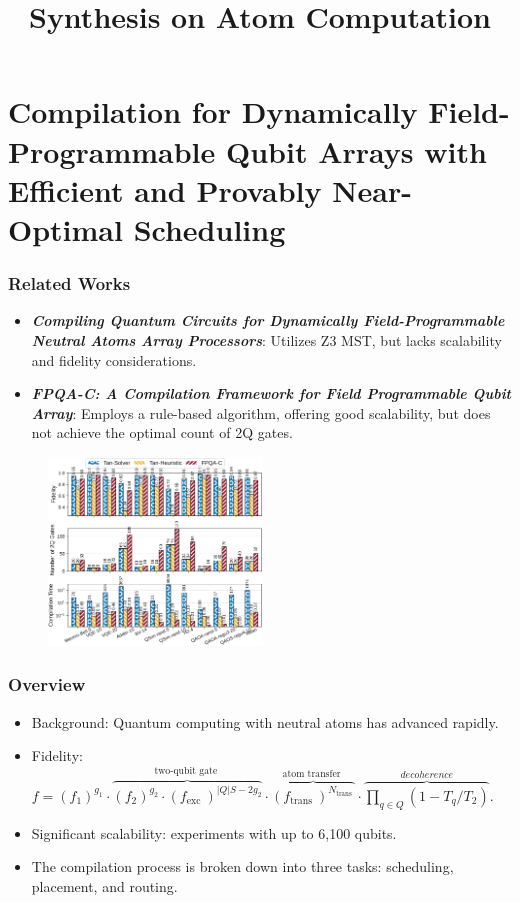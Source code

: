 \documentclass[18 pt]{beamer}
\title{Synthesis on Atom Computation}
\begin{document}
\begin{frame}[plain]
    \titlepage
\end{frame}
\section{Compilation for Dynamically Field-Programmable Qubit Arrays with Efficient and Provably Near-Optimal Scheduling}
\begin{frame}
    \frametitle{Related Works}
    \begin{itemize}
        \item \textbf{\textit{Compiling Quantum Circuits for Dynamically Field-Programmable Neutral Atoms Array Processors}}: Utilizes Z3 MST, but lacks scalability and fidelity considerations.
        \item \textbf{\textit{FPQA-C: A Compilation Framework for Field Programmable Qubit Array}}: Employs a rule-based algorithm, offering good scalability, but does not achieve the optimal count of 2Q gates.
    \end{itemize}
    \begin{figure}
        \includegraphics[height=5cm]{back.png}
    \end{figure}
\end{frame}

\begin{frame}
    \frametitle{Overview}
    \begin{itemize}
        \item Background: Quantum computing with neutral atoms has advanced rapidly.
        \item Fidelity: \(f=\left(f_{1}\right)^{g_{1}} \cdot \overbrace{\left(f_{2}\right)^{g_{2}} \cdot\left(f_{\text {exc }}\right)^{|Q| S-2 g_{2}}}^{\text {two-qubit gate }} \cdot \overbrace{\left(f_{\text {trans }}\right)^{N_{\text {trans }}}}^{\text {atom transfer }}\cdot \overbrace{\prod_{q\in Q} (1-T_q/T_2)}^{decoherence}\).
        \item Significant scalability: experiments with up to 6,100 qubits.
        \item The compilation process is broken down into three tasks: scheduling, placement, and routing.
    \end{itemize}
\end{frame}
\end{document}
